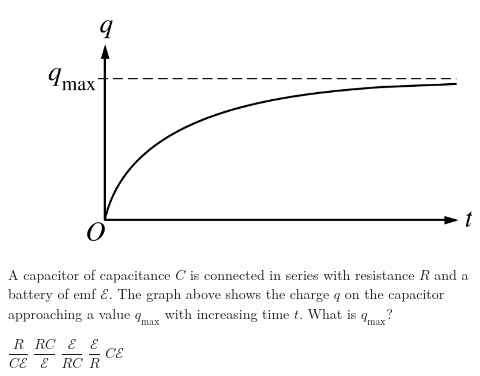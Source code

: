 \begin{figure}[H]
\centering
\includegraphics[scale=0.25]{images/img-012-035.png}
\end{figure}

\begin{questions}\setcounter{question}{24}\question
A capacitor of capacitance $C$ is connected in series with resistance $R$ and a battery of emf $\mathcal{E}$. The graph above shows the charge $q$ on the capacitor approaching a value $q_{\max}$ with increasing time $t$. What is $q_{\max}$?

\begin{oneparchoices}
\choice $\dfrac{R}{C \mathcal{E}}$
\choice $\dfrac{R C}{\mathcal{E}}$
\choice $\dfrac{\mathcal{E}}{R C}$
\choice $\dfrac{\mathcal{E}}{R}$
\choice $C \mathcal{E}$
\end{oneparchoices}\end{questions}

